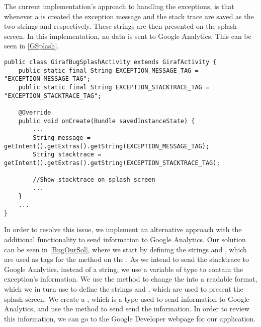 The current implementation's approach to handling the exceptions, is
that whenever a  is created the exception message
and the stack trace are saved as the two strings  and
 respectively. These strings are then presented on the splash
screen. In this implementation, no data is sent to Google Analytics. This can be
seen in \autoref{GSplash}.\nl

\begin{minipage}[H]{\linewidth}
\begin{lstlisting}[caption = Code responsible for showing the GIRAF splash screen., label = GSplash]
public class GirafBugSplashActivity extends GirafActivity { 
	public static final String EXCEPTION_MESSAGE_TAG = "EXCEPTION_MESSAGE_TAG"; 
	public static final String EXCEPTION_STACKTRACE_TAG = "EXCEPTION_STACKTRACE_TAG";
	
	@Override
    public void onCreate(Bundle savedInstanceState) {
		...
		String message = getIntent().getExtras().getString(EXCEPTION_MESSAGE_TAG);
        String stacktrace = getIntent().getExtras().getString(EXCEPTION_STACKTRACE_TAG);
        
        //Show stacktrace on splash screen
        ...
    }	
	...
}
\end{lstlisting}
\end{minipage}

In order to resolve this issue, we implement an alternative approach with the
additional functionality to send information to Google Analytics. Our solution
can be seen in \autoref{BugOurSol}, where we start by defining the strings
 and , which are used as tags for
the  method on the . As we intend to send the
stacktrace to Google Analytics, instead of a string, we use a variable of type  to
contain the exception's information. We use the method  to change the
 into a readable format, which we in turn use to define the
strings  and , which are used to present the
splash screen. We create a , which is a type used to send
information to Google Analytics, and use the  method to send
send the information. In order to review this information, we can go to the
Google Developer webpage for our application.\nl 

